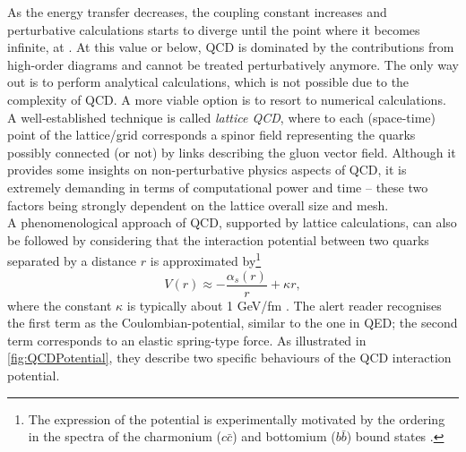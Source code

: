 As the energy transfer decreases, the coupling constant increases and perturbative calculations starts to diverge until the point where it becomes infinite, at \LambdaQCD. At this value or below, QCD is dominated by the contributions from high-order diagrams and cannot be treated perturbatively anymore. The only way out is to perform analytical calculations, which is not possible due to the complexity of QCD. A more viable option is to resort to numerical calculations. A well-established technique is called \textit{lattice QCD}, where to each (space-time) point of the \mbox{lattice/grid} corresponds a spinor field representing the quarks possibly connected (or not) by links describing the gluon vector field. Although it provides some insights on non-perturbative physics aspects of QCD, it is extremely demanding in terms of computational power and time -- these two factors being strongly dependent on the lattice overall size and mesh.\\

A phenomenological approach of QCD, supported by lattice calculations, can also be followed by considering that the interaction potential between two quarks separated by a distance $r$ is approximated by\footnote{The expression of the potential is experimentally motivated by the ordering in the spectra of the charmonium ($c\bar{c}$) and bottomium ($b\bar{b}$) bound states \cite{thomsonModernParticlePhysics2013} \cite{martinParticlePhysics2017}.}
\begin{equation}
V(r) \approx - \frac{\alpha_{s}(r)}{r} + \kappa r,
\label{eq:QCDPotential}
\end{equation}
where the constant $\kappa$ is typically about 1 GeV/fm \cite{martinParticlePhysics2017}. The alert reader recognises the first term as the Coulombian-potential, similar to the one in QED; the second term corresponds to an elastic spring-type force. As illustrated in \fig\ref{fig:QCDPotential}, they describe two specific behaviours of the QCD interaction potential.

